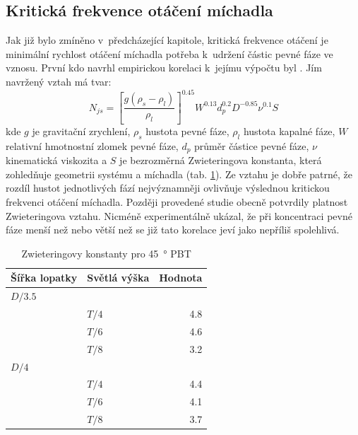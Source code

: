 \subsection{Kritická frekvence otáčení míchadla}
Jak již bylo zmíněno v~předcházející kapitole, kritická frekvence otáčení je minimální rychlost otáčení míchadla potřeba k~udržení částic pevné fáze ve vznosu. První kdo navrhl empirickou korelaci k~jejímu výpočtu byl \citet{zwi58}. Jím navržený vztah má tvar:
\begin{equation}
	N_{js} = \left[\frac{g(\rho_{s}-\rho_{l})}{\rho_{l}}\right]^{\num{0.45}}W^{\num{0.13}}d_{p}^{\num{0.2}}D^{\num{-0.85}}\nu^{\num{0.1}}S
	\label{eq:nkrit}
\end{equation} 
kde $g$ je gravitační zrychlení, $\rho_{s}$ hustota pevné fáze, $\rho_{l}$ hustota kapalné fáze, $W$ relativní hmotnostní zlomek pevné fáze, $d_{p}$ průměr částice pevné fáze, $\nu$ kinematická viskozita a $S$ je bezrozměrná Zwieteringova konstanta, která zohledňuje geometrii systému a míchadla (tab. \ref{tab:S}). Ze vztahu je dobře patrné, že rozdíl hustot jednotlivých fází nejvýznamněji ovlivňuje výslednou kritickou frekvenci otáčení míchadla. Později provedené studie \citep{nie68,bal78,chou97} obecně potvrdily platnost Zwieteringova vztahu. Nicméně \citet{chou97} experimentálně ukázal, že při koncentraci pevné fáze menší než  nebo větší než  se již tato korelace jeví jako nepříliš spolehlivá.

\begin{table}[h!]
\begin{center}
\caption{Zwieteringovy konstanty pro \SI{45}{\degree} PBT}
\label{tab:S}
\begin{tabular}{llr}
\toprule
\textbf{Šířka lopatky} & \textbf{Světlá výška} & \textbf{Hodnota} \\
\midrule

$D/\num{3.5}$ \\
& $T/4$ & \num{4.8} \\
& $T/6$ & \num{4.6} \\
& $T/8$ & \num{3.2} \\
$D/4$ \\
& $T/4$ & \num{4.4} \\
& $T/6$ & \num{4.1} \\
& $T/8$ & \num{3.7} \\

\bottomrule
\end{tabular}
\end{center}
\end{table}

